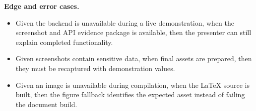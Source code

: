 \textbf{Edge and error cases.}
\begin{itemize}
  \item Given the backend is unavailable during a live demonstration, when the screenshot and API evidence package is available, then the presenter can still explain completed functionality.
  \item Given screenshots contain sensitive data, when final assets are prepared, then they must be recaptured with demonstration values.
  \item Given an image is unavailable during compilation, when the LaTeX source is built, then the figure fallback identifies the expected asset instead of failing the document build.
\end{itemize}
